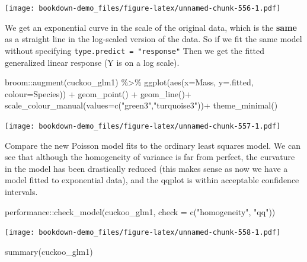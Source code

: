 \documentclass[
]{book}
\newenvironment{Shaded}{\begin{snugshade}}{\end{snugshade}}
\newcommand{\AttributeTok}[1]{\textcolor[rgb]{0.77,0.63,0.00}{#1}}
\newcommand{\FunctionTok}[1]{\textcolor[rgb]{0.00,0.00,0.00}{#1}}
\newcommand{\NormalTok}[1]{#1}
\newcommand{\SpecialCharTok}[1]{\textcolor[rgb]{0.00,0.00,0.00}{#1}}
\newcommand{\StringTok}[1]{\textcolor[rgb]{0.31,0.60,0.02}{#1}}
\begin{document}
\texttt{[image: bookdown-demo\_files/figure-latex/unnamed-chunk-556-1.pdf]}

We get an exponential curve in the scale of the original data, which is the \textbf{same} as a straight line in the log-scaled version of the data. So if we fit the same model without specifying \texttt{type.predict\ =\ "response"} Then we get the fitted generalized linear response (Y is on a log scale).

\begin{Shaded}
\begin{Highlighting}[]
\NormalTok{broom}\SpecialCharTok{::}\FunctionTok{augment}\NormalTok{(cuckoo\_glm1) }\SpecialCharTok{\%\textgreater{}\%} 
\FunctionTok{ggplot}\NormalTok{(}\FunctionTok{aes}\NormalTok{(}\AttributeTok{x=}\NormalTok{Mass, }\AttributeTok{y=}\NormalTok{.fitted, }\AttributeTok{colour=}\NormalTok{Species)) }\SpecialCharTok{+} 
  \FunctionTok{geom\_point}\NormalTok{() }\SpecialCharTok{+}
  \FunctionTok{geom\_line}\NormalTok{()}\SpecialCharTok{+}
  \FunctionTok{scale\_colour\_manual}\NormalTok{(}\AttributeTok{values=}\FunctionTok{c}\NormalTok{(}\StringTok{"green3"}\NormalTok{,}\StringTok{"turquoise3"}\NormalTok{))}\SpecialCharTok{+}
  \FunctionTok{theme\_minimal}\NormalTok{()}
\end{Highlighting}
\end{Shaded}

\texttt{[image: bookdown-demo\_files/figure-latex/unnamed-chunk-557-1.pdf]}

Compare the new Poisson model fits to the ordinary least squares model. We can see that although the homogeneity of variance is far from perfect, the curvature in the model has been drastically reduced (this makes sense as now we have a model fitted to exponential data), and the qqplot is within acceptable confidence intervals.

\begin{Shaded}
\begin{Highlighting}[]
\NormalTok{performance}\SpecialCharTok{::}\FunctionTok{check\_model}\NormalTok{(cuckoo\_glm1, }
                         \AttributeTok{check =} \FunctionTok{c}\NormalTok{(}\StringTok{"homogeneity"}\NormalTok{,}
                                   \StringTok{"qq"}\NormalTok{))}
\end{Highlighting}
\end{Shaded}

\texttt{[image: bookdown-demo\_files/figure-latex/unnamed-chunk-558-1.pdf]}

\begin{Shaded}
\begin{Highlighting}[]
\FunctionTok{summary}\NormalTok{(cuckoo\_glm1)}
\end{Highlighting}
\end{Shaded}
\end{document}
